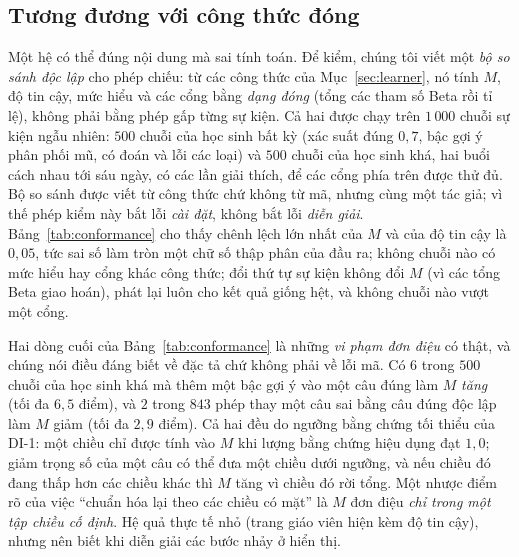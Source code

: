 \subsection{Tương đương với công thức đóng}\label{sec:conformance}
Một hệ có thể đúng nội dung mà sai tính toán. Để kiểm, chúng tôi viết một \emph{bộ so sánh độc lập} cho phép chiếu: từ các công thức của Mục~\ref{sec:learner}, nó tính $M$, độ tin cậy, mức hiểu và các cổng bằng \emph{dạng đóng} (tổng các tham số Beta rồi tỉ lệ), không phải bằng phép gấp từng sự kiện. Cả hai được chạy trên $1\,000$ chuỗi sự kiện ngẫu nhiên: $500$ chuỗi của học sinh bất kỳ (xác suất đúng $0{,}7$, bậc gợi ý phân phối mũ, có đoán và lỗi các loại) và $500$ chuỗi của học sinh khá, hai buổi cách nhau tới sáu ngày, có các lần giải thích, để các cổng phía trên được thử đủ. Bộ so sánh được viết từ công thức chứ không từ mã, nhưng cùng một tác giả; vì thế phép kiểm này bắt lỗi \emph{cài đặt}, không bắt lỗi \emph{diễn giải}. Bảng~\ref{tab:conformance} cho thấy chênh lệch lớn nhất của $M$ và của độ tin cậy là $0{,}05$, tức sai số làm tròn một chữ số thập phân của đầu ra; không chuỗi nào có mức hiểu hay cổng khác công thức; đổi thứ tự sự kiện không đổi $M$ (vì các tổng Beta giao hoán), phát lại luôn cho kết quả giống hệt, và không chuỗi nào vượt một cổng.

\begin{table}[tbp]
\centering
\caption{Kiểm tương đương giữa phép chiếu và công thức đóng, và các tính chất của đặc tả, trên $1\,000$ chuỗi sự kiện ngẫu nhiên (chương mẫu, tiết không có tiên quyết nên điểm khởi đầu là $0{,}5$).}
\label{tab:conformance}

\end{table}

Hai dòng cuối của Bảng~\ref{tab:conformance} là những \emph{vi phạm đơn điệu} có thật, và chúng nói điều đáng biết về đặc tả chứ không phải về lỗi mã. Có $6$ trong $500$ chuỗi của học sinh khá mà thêm một bậc gợi ý vào một câu đúng làm $M$ \emph{tăng} (tối đa $6{,}5$ điểm), và $2$ trong $843$ phép thay một câu sai bằng câu đúng độc lập làm $M$ giảm (tối đa $2{,}9$ điểm). Cả hai đều do ngưỡng bằng chứng tối thiểu của DI-1: một chiều chỉ được tính vào $M$ khi lượng bằng chứng hiệu dụng đạt $1{,}0$; giảm trọng số của một câu có thể đưa một chiều dưới ngưỡng, và nếu chiều đó đang thấp hơn các chiều khác thì $M$ tăng vì chiều đó rời tổng. Một nhược điểm rõ của việc ``chuẩn hóa lại theo các chiều có mặt'' là $M$ đơn điệu \emph{chỉ trong một tập chiều cố định}. Hệ quả thực tế nhỏ (trang giáo viên hiện kèm độ tin cậy), nhưng nên biết khi diễn giải các bước nhảy ở hiển thị.

